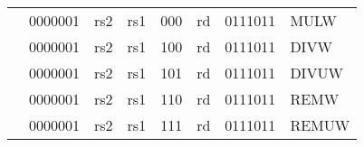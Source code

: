 \begin{table}[p]
\begin{small}
\begin{center}
\begin{tabular}{p{0in}p{0.4in}p{0.05in}p{0.05in}p{0.05in}p{0.05in}p{0.4in}p{0.6in}p{0.4in}p{0.6in}p{0.7in}l}
&
\multicolumn{4}{|c|}{0000001} &
\multicolumn{2}{c|}{rs2} &
\multicolumn{1}{c|}{rs1} &
\multicolumn{1}{c|}{000} &
\multicolumn{1}{c|}{rd} &
\multicolumn{1}{c|}{0111011} & MULW \\
\cline{2-11}


&
\multicolumn{4}{|c|}{0000001} &
\multicolumn{2}{c|}{rs2} &
\multicolumn{1}{c|}{rs1} &
\multicolumn{1}{c|}{100} &
\multicolumn{1}{c|}{rd} &
\multicolumn{1}{c|}{0111011} & DIVW \\
\cline{2-11}


&
\multicolumn{4}{|c|}{0000001} &
\multicolumn{2}{c|}{rs2} &
\multicolumn{1}{c|}{rs1} &
\multicolumn{1}{c|}{101} &
\multicolumn{1}{c|}{rd} &
\multicolumn{1}{c|}{0111011} & DIVUW \\
\cline{2-11}


&
\multicolumn{4}{|c|}{0000001} &
\multicolumn{2}{c|}{rs2} &
\multicolumn{1}{c|}{rs1} &
\multicolumn{1}{c|}{110} &
\multicolumn{1}{c|}{rd} &
\multicolumn{1}{c|}{0111011} & REMW \\
\cline{2-11}


&
\multicolumn{4}{|c|}{0000001} &
\multicolumn{2}{c|}{rs2} &
\multicolumn{1}{c|}{rs1} &
\multicolumn{1}{c|}{111} &
\multicolumn{1}{c|}{rd} &
\multicolumn{1}{c|}{0111011} & REMUW \\
\cline{2-11}


\end{tabular}
\end{center}
\end{small}

\end{table}


\newpage

